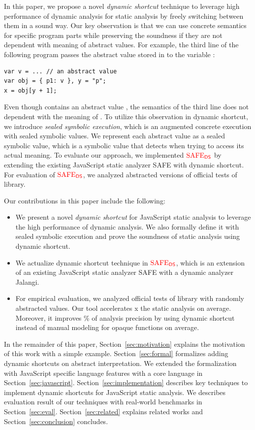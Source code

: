 In this paper, we propose a novel \textit{dynamic shortcut} technique to
leverage high performance of dynamic analysis for static analysis by freely
switching between them in a sound way.  Our key observation is that we can
use concrete semantics for specific program parts while preserving the soundness
if they are not dependent with meaning of abstract values.  For example, the
third line of the following program passes the abstract value  stored
in  to the variable :
\begin{lstlisting}[style=myJSstyle,numbers=none]
var v = ... // an abstract value
var obj = { p1: v }, y = "p";
x = obj[y + 1];
\end{lstlisting}
Even though  contains an abstract value , the semantics of
the third line does not dependent with the meaning of .  To utilize
this observation in dynamic shortcut, we introduce \textit{sealed symbolic
execution}, which is an augmented concrete execution with sealed symbolic
values.  We represent each abstract value as a sealed symbolic value, which is a
symbolic value that detects when trying to access its actual meaning.  To
evaluate our approach, we implemented ${\color{red}{\text{SAFE}_{\textsf{DS}}}}$ by extending the existing
JavaScript static analyzer SAFE with dynamic shortcut.  For evaluation of
${\color{red}{\text{SAFE}_{\textsf{DS}}}}$, we analyzed abstracted versions of  official tests of
 library.

Our contributions in this paper include the following:
\begin{itemize}
  \item We present a novel \textit{dynamic shortcut} for JavaScript static
    analysis to leverage the high performance of dynamic analysis.  We also
    formally define it with sealed symbolic execution and prove the soundness of
    static analysis using dynamic shortcut.
  \item We actualize dynamic shortcut technique in ${\color{red}{\text{SAFE}_{\textsf{DS}}}}$, which is an
    extension of an existing JavaScript static analyzer SAFE with a dynamic
    analyzer Jalangi.
  \item For empirical evaluation, we analyzed  official tests of
     library with randomly abstracted values.  Our tool
    accelerates x the static analysis on average.  Moreover, it
    improves \% of analysis precision by using dynamic shortcut
    instead of manual modeling for  opaque functions on average.
\end{itemize}

In the remainder of this paper, Section~\ref{sec:motivation} explains the
motivation of this work with a simple example.  Section~\ref{sec:formal}
formalizes adding dynamic shortcuts on abstract interpretation.  We extended the
formalization with JavaScript specific language features with a core language in
Section~\ref{sec:javascript}.  Section~\ref{sec:implementation} describes
key techniques to implement dynamic shortcuts for JavaScript static analysis.
We describes evaluation result of our techniques with real-world benchmarks in
Section~\ref{sec:eval}.  Section~\ref{sec:related} explains related works and
Section~\ref{sec:conclusion} concludes.
